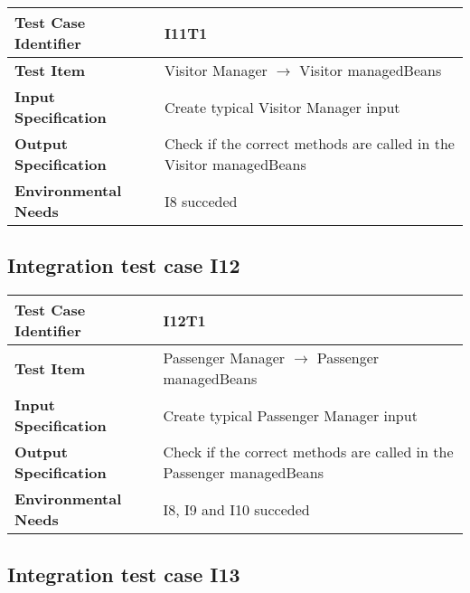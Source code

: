 \begin{table}[!htbp]
\begin{center}
\begin{tabular}[t]{p{}|p{}}

\hline
\textbf{Test Case Identifier} & I11T1 \\
\hline
\textbf{Test Item} & Visitor Manager $\rightarrow$ Visitor managedBeans \\
\hline
\textbf{Input Specification} & Create typical Visitor Manager input  \\
\hline
\textbf{Output Specification} & Check if the correct methods are called in the Visitor managedBeans \\
\hline
\textbf{Environmental Needs} & I8 succeded \\
\hline

\end{tabular}
\end{center}
\end{table}
\clearpage


\subsection{Integration test case I12}

\begin{table}[!htbp]
\begin{center}
\begin{tabular}[t]{p{}|p{}}

\hline
\textbf{Test Case Identifier} & I12T1 \\
\hline
\textbf{Test Item} & Passenger Manager $\rightarrow$ Passenger managedBeans \\
\hline
\textbf{Input Specification} & Create typical Passenger Manager input  \\
\hline
\textbf{Output Specification} & Check if the correct methods are called in the Passenger managedBeans \\
\hline
\textbf{Environmental Needs} & I8, I9 and I10 succeded \\
\hline

\end{tabular}
\end{center}
\end{table}

\subsection{Integration test case I13}

